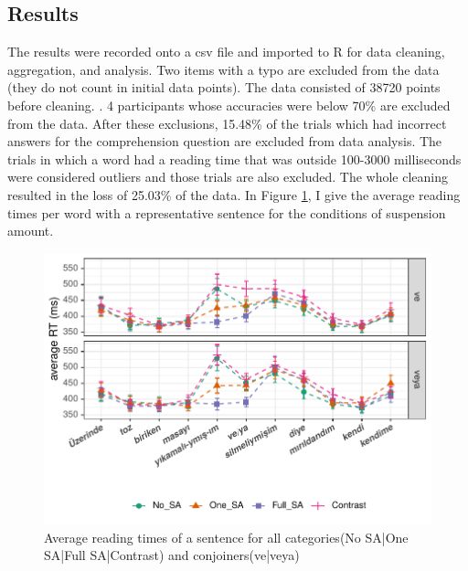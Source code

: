 \subsection{Results}

The results were recorded onto a csv file and imported to R \citep{team2013r} for data cleaning, aggregation, and analysis. Two items with a typo are excluded from the data (they do not count in initial data points). The data consisted of 38720 points before cleaning. . 4 participants whose accuracies were below 70\% are excluded from the data. After these exclusions, 15.48\% of the trials which had incorrect answers for the comprehension question are excluded from data analysis. The trials in which a word had a reading time that was outside 100-3000 milliseconds were considered outliers and those trials are also excluded. The whole cleaning resulted in the loss of 25.03\% of the data. In Figure \ref{fig:secondplot}, I give the average reading times per word with a representative sentence for the conditions of suspension amount.

\begin{knitrout}
\color{fgcolor}\begin{figure}[hbt!]

{\centering \includegraphics[]{experiments/selfpaced/report/figure/secondplot-1.pdf} 

}

\caption[Average reading times of a sentence for all categories(No SA|One SA|Full SA|Contrast) and conjoiners(ve|veya)]{Average reading times of a sentence for all categories(No SA|One SA|Full SA|Contrast) and conjoiners(ve|veya)}\label{fig:secondplot}
\end{figure}


\end{knitrout}


